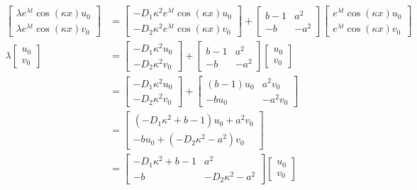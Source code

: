 \documentclass[10pt]{article}
\begin{document}
\begin{align*}
    \begin{bmatrix}
        \lambda e^{\lambda t} \cos(\kappa x)u_0\\
        \lambda e^{\lambda t} \cos(\kappa x)v_0
    \end{bmatrix} &= \begin{bmatrix}
        -D_1\kappa^2 e^{\lambda t}\cos(\kappa x) u_0\\
        -D_2\kappa^2 e^{\lambda t}\cos(\kappa x) v_0
    \end{bmatrix} + \begin{bmatrix}
        b - 1 & a^2\\
        -b & -a^2
    \end{bmatrix}\begin{bmatrix}
        e^{\lambda t} \cos(\kappa x)u_0\\
        e^{\lambda t} \cos(\kappa x)v_0
    \end{bmatrix}\\
    \lambda \begin{bmatrix}
        u_0\\v_0
    \end{bmatrix} &= \begin{bmatrix}
        -D_1\kappa^2 u_0\\
        -D_2 \kappa^2 v_0
    \end{bmatrix} + \begin{bmatrix}
        b - 1 & a^2\\
        -b & -a^2
    \end{bmatrix}\begin{bmatrix}
        u_0\\
        v_0
    \end{bmatrix}\\
    &= \begin{bmatrix}
        -D_1\kappa^2 u_0\\
        -D_2 \kappa^2 v_0
    \end{bmatrix} + \begin{bmatrix}
        (b - 1)u_0 & a^2v_0\\
        -bu_0 & -a^2v_0
    \end{bmatrix}\\
    &= \begin{bmatrix}
        (-D_1\kappa^2 + b - 1)u_0 + a^2v_0\\
        -bu_0 + (-D_2 \kappa^2 -a^2)v_0
    \end{bmatrix} \\
    &= \begin{bmatrix}
        -D_1\kappa^2 + b - 1 & a^2\\
        -b & -D_2 \kappa^2 -a^2
    \end{bmatrix}\begin{bmatrix}
        u_0\\v_0
    \end{bmatrix}
\end{align*}
\end{document}
